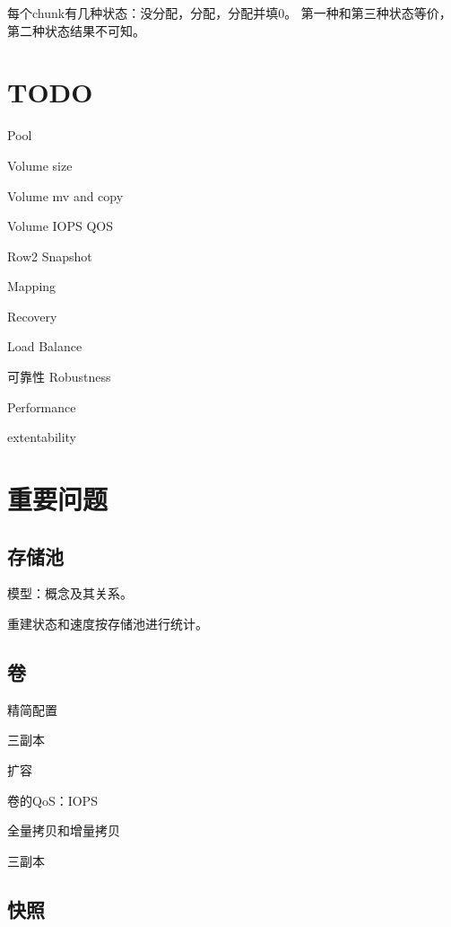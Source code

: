 每个chunk有几种状态：没分配，分配，分配并填0。
第一种和第三种状态等价，第二种状态结果不可知。

\section{TODO}

\begin{enumbox}
\item Pool
\item Volume size
\item Volume mv and copy
\item Volume IOPS QOS
\item Row2 Snapshot
\item Mapping
\item Recovery
\item Load Balance
\item 可靠性 Robustness
\item Performance
\item extentability
\end{enumbox}

\section{重要问题}

\subsection{存储池}

模型：概念及其关系。

重建状态和速度按存储池进行统计。

\subsection{卷}

\begin{enumbox}
\item 精简配置
\item 三副本
\item 扩容
\item 卷的QoS：IOPS
\item 全量拷贝和增量拷贝
\end{enumbox}

三副本 

\subsection{快照}

